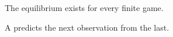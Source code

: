 \begin{theorem}
  The equilibrium exists for every finite game.
\end{theorem}

\begin{definition}
  A  predicts the next observation from the last.
\end{definition}


